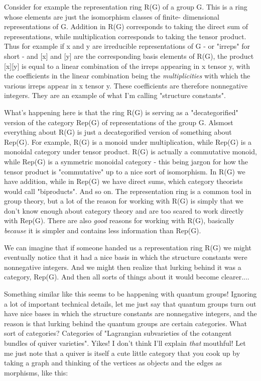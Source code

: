 Consider for example the representation ring R(G) of a group G.  This is
a ring whose elements are just the isomorphism classes of finite-
dimensional representations of G.  Addition in R(G) corresponds to
taking the direct sum of representations, while multiplication
corresponds to taking the tensor product.  Thus for example if x and y
are irreducible representations of G - or "irreps" for short - and
[x] and [y] are the corresponding basis elements of R(G), the product
[x][y] is equal to a linear combination of the irreps appearing in x
tensor y, with the coefficients in the linear combination being the
\emph{multiplicities} with which the various irreps appear in x tensor y.
These coefficients are therefore nonnegative integers.  They are an
example of what I'm calling "structure constants".

What's happening here is that the ring R(G) is serving as a
"decategorified" version of the category Rep(G) of representations of
the group G.  Alsmost everything about R(G) is just a decategorified
version of something about Rep(G).  For example, R(G) is a monoid under
multiplication, while Rep(G) is a monoidal category under tensor
product.  R(G) is actually a commutative monoid, while Rep(G) is a
symmetric monoidal category - this being jargon for how the tensor
product is "commutative" up to a nice sort of isomorphism.  In R(G) we
have addition, while in Rep(G) we have direct sums, which category
theorists would call "biproducts".  And so on.  The representation ring
is a common tool in group theory, but a lot of the reason for working
with R(G) is simply that we don't know enough about category theory and
are too scared to work directly with Rep(G).  There are also \emph{good}
reasons for working with R(G), basically \emph{because} it is simpler and
contains less information than Rep(G).

We can imagine that if someone handed us a representation ring R(G) we
might eventually notice that it had a nice basis in which the structure
constants were nonnegative integers.  And we might then realize that
lurking behind it was a category, Rep(G).  And then all sorts of things
about it would become clearer....

Something similar like this seems to be happening with quantum groups!
Ignoring a lot of important technical details, let me just say that
quantum groups turn out have nice bases in which the structure constants
are nonnegative integers, and the reason is that lurking behind the
quantum groups are certain categories.  What sort of categories?
Categories of "Lagrangian subvarieties of the cotangent bundles of
quiver varieties".  Yikes!  I don't think I'll explain \emph{that} mouthful!
Let me just note that a quiver is itself a cute little category that you
cook up by taking a graph and thinking of the vertices as objects
and the edges as morphisms, like this:


